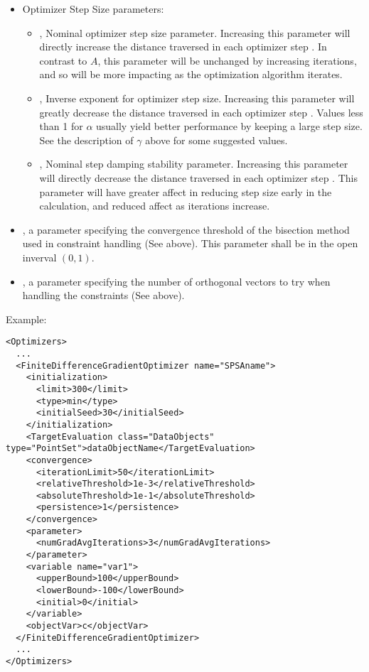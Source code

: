 \begin{itemize}
\begin{itemize}
  \item Optimizer Step Size parameters:
    \begin{itemize}
      \item {},  Nominal optimizer step size parameter.  Increasing
        this parameter will directly increase the distance traversed in each optimizer step
        \cite{spall1998implementation}. In contrast to $A$, this parameter will be unchanged by increasing
        iterations, and so will be more impacting as the optimization algorithm iterates. 
      \item {},  Inverse exponent for optimizer step size.
        Increasing this parameter will greatly decrease the distance traversed in each optimizer step
        \cite{spall1998implementation}. Values less than 1 for $\alpha$ usually yield better performance by
        keeping a large step size. See the description of $\gamma$ above for some suggested values. 
      \item {},  Nominal step damping stability parameter.  Increasing this
        parameter will directly decrease the distance traversed in each optimizer step
        \cite{spall1998implementation}. This parameter will have greater affect in reducing step size early in
        the calculation, and reduced affect as iterations increase. 
    \end{itemize}
  \item {},  a parameter specifying the convergence threshold of the
  bisection method used in constraint handling (See above). This parameter shall be in the open inverval $(0,1)$.
  \item {},  a parameter specifying the number of orthogonal vectors to try
  when handling the constraints (See above).
  \end{itemize}
\end{itemize}


Example:
\begin{lstlisting}[style=XML]
<Optimizers>
  ...
  <FiniteDifferenceGradientOptimizer name="SPSAname">
    <initialization>
      <limit>300</limit>
      <type>min</type>
      <initialSeed>30</initialSeed>
    </initialization>
    <TargetEvaluation class="DataObjects" type="PointSet">dataObjectName</TargetEvaluation>
    <convergence>
      <iterationLimit>50</iterationLimit>
      <relativeThreshold>1e-3</relativeThreshold>
      <absoluteThreshold>1e-1</absoluteThreshold>
      <persistence>1</persistence>
    </convergence>
    <parameter>
      <numGradAvgIterations>3</numGradAvgIterations>
    </parameter>
    <variable name="var1">
      <upperBound>100</upperBound>
      <lowerBound>-100</lowerBound>
      <initial>0</initial>
    </variable>
    <objectVar>c</objectVar>
  </FiniteDifferenceGradientOptimizer>
  ...
</Optimizers>
\end{lstlisting}
